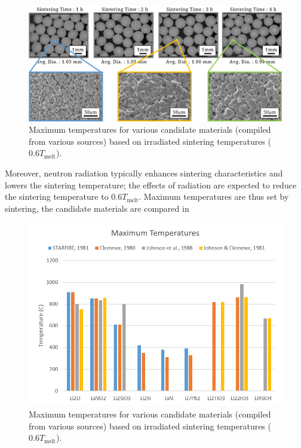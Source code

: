 \documentclass[11pt]{report} %
\begin{document}
\begin{figure}[ht]
	\centering
	\includegraphics[width=\textwidth]{images/material-production-NFRI} 
	\caption{Maximum temperatures for various candidate materials (compiled from various sources) based on irradiated sintering temperatures ($0.6T_\text{melt}$).}
	\label{fig:material-production-NFRI}
\end{figure}

Moreover, neutron radiation typically enhances sintering characteristics and lowers the sintering temperature; the effects of radiation are expected to reduce the sintering temperature to $0.6 T_\text{melt}$.\cite{Johnson1981} Maximum temperatures are thus set by sintering, the candidate materials are compared in 

\begin{figure}[ht]
	\centering
	\includegraphics[width=\textwidth]{images/Tmax} 
	\caption{Maximum temperatures for various candidate materials (compiled from various sources) based on irradiated sintering temperatures ($0.6T_\text{melt}$).}
	\label{fig:Tmax}
\end{figure}
\end{document}

